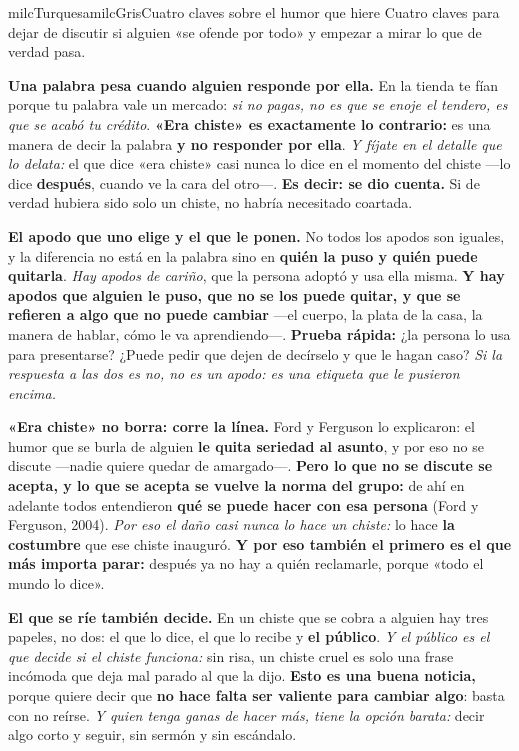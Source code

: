 \documentclass[11pt,letterpaper]{article}
\newcommand{\milcpaso}[3]{%
\Needspace{4\baselineskip}%
\begin{tcolorbox}[enhanced,colback=white,colframe=milcLinea,arc=1.5mm,boxrule=.9pt,
  left=14mm,right=4mm,top=3mm,bottom=3mm,before skip=4pt,after skip=4pt,
  fontupper=\RaggedRight,
  overlay={\node[anchor=north west,circle,fill=#2,text=white,inner sep=0pt,
    minimum size=7.4mm,font=\sffamily\bfseries\small]
    at ([xshift=3.6mm,yshift=-3.2mm]frame.north west) {#1};}]
#3
\end{tcolorbox}}
\begin{document}
\begin{softbox}{milcTurquesa}{milcGris}{Cuatro claves sobre el humor que hiere}
Cuatro claves para dejar de discutir si alguien «se ofende por todo» y empezar a mirar lo que de verdad pasa.
\end{softbox}

\milcpaso{1}{milcTurquesa}{\textbf{Una palabra pesa cuando alguien responde por ella.} En la tienda te fían porque tu palabra vale un mercado: \emph{si no pagas, no es que se enoje el tendero, es que se acabó tu crédito}. \textbf{«Era chiste» es exactamente lo contrario:} es una manera de decir la palabra \textbf{y no responder por ella}. \emph{Y fíjate en el detalle que lo delata:} el que dice «era chiste» casi nunca lo dice en el momento del chiste ---lo dice \textbf{después}, cuando ve la cara del otro---. \textbf{Es decir: se dio cuenta.} Si de verdad hubiera sido solo un chiste, no habría necesitado coartada.}
\milcpaso{2}{milcTurquesa}{\textbf{El apodo que uno elige y el que le ponen.} No todos los apodos son iguales, y la diferencia no está en la palabra sino en \textbf{quién la puso y quién puede quitarla}. \emph{Hay apodos de cariño}, que la persona adoptó y usa ella misma. \textbf{Y hay apodos que alguien le puso, que no se los puede quitar, y que se refieren a algo que no puede cambiar} ---el cuerpo, la plata de la casa, la manera de hablar, cómo le va aprendiendo---. \textbf{Prueba rápida:} ¿la persona lo usa para presentarse? ¿Puede pedir que dejen de decírselo y que le hagan caso? \emph{Si la respuesta a las dos es no, no es un apodo: es una etiqueta que le pusieron encima.}}
\milcpaso{3}{milcTurquesa}{\textbf{«Era chiste» no borra: corre la línea.} Ford y Ferguson lo explicaron: el humor que se burla de alguien \textbf{le quita seriedad al asunto}, y por eso no se discute ---nadie quiere quedar de amargado---. \textbf{Pero lo que no se discute se acepta, y lo que se acepta se vuelve la norma del grupo:} de ahí en adelante todos entendieron \textbf{qué se puede hacer con esa persona} (Ford y Ferguson, 2004). \emph{Por eso el daño casi nunca lo hace un chiste:} lo hace \textbf{la costumbre} que ese chiste inauguró. \textbf{Y por eso también el primero es el que más importa parar:} después ya no hay a quién reclamarle, porque «todo el mundo lo dice».}
\milcpaso{4}{milcTurquesa}{\textbf{El que se ríe también decide.} En un chiste que se cobra a alguien hay tres papeles, no dos: el que lo dice, el que lo recibe y \textbf{el público}. \emph{Y el público es el que decide si el chiste funciona:} sin risa, un chiste cruel es solo una frase incómoda que deja mal parado al que la dijo. \textbf{Esto es una buena noticia,} porque quiere decir que \textbf{no hace falta ser valiente para cambiar algo}: basta con no reírse. \emph{Y quien tenga ganas de hacer más, tiene la opción barata:} decir algo corto y seguir, sin sermón y sin escándalo.}
\end{document}
